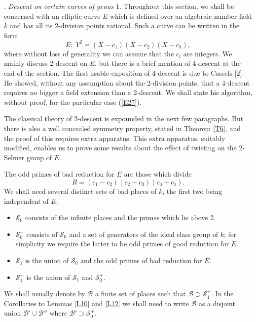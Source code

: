 \documentclass[12pt]{article}
\def\sB{{\mathcal B}}
\def\sS{{\mathcal S}}
\def\beq{\begin{equation} \label}
\begin{document}
\newpage

. \emph{Descent on certain curves of genus $1$}.
\newline
Throughout this section, we shall be concerned with an elliptic curve $E$
which is defined over an algebraic number field $k$ and has all its 2-division
points rational. Such a curve can be written in the form
\beq{E27} E:\; Y^2=(X-c_1)(X-c_2)(X-c_3), \end{equation}
where without loss of generality we can assume that the $c_i$
are integers. We mainly discuss 2-descent on $E$, but there
is a brief mention of 4-descent at the end of the section.
The first usable exposition of 4-descent is due to Cassels
[2]. He showed, without any
assumption about the 2-division points, that a 4-descent
requires no bigger a field extension than a 2-descent. We
shall state his
algorithm, without proof, for the particular case (\ref{E27}).

The classical theory of
2-descent is expounded in the next few paragraphs. But there is also a well
concealed symmetry property, stated in Theorem \ref{T6}, and the
proof of this requires extra apparatus. This extra apparatus,
suitably modified, enables us to prove some results about the
effect of twisting on the 2-Selmer group of $E$.


The odd primes of bad reduction for $E$ are those which divide
\[ R=(c_1-c_2)(c_2-c_3)(c_3-c_1). \]
We shall need several distinct sets of bad places of $k$, the first two being
independent of $E$:
\begin{itemize}
\item $\sS_0$ consists of the infinite places and the primes which lie above
2.
\item $\sS_0^+$ consists of $\sS_0$ and a set of generators of the ideal
class group of $k$; for simplicity we require the latter to be
odd primes of good reduction for $E$.
\item $\sS_1$ is the union of $\sS_0$ and the odd primes of bad reduction for
$E$.
\item $\sS_1^+$ is the union of $\sS_1$ and $\sS_0^+$.
\end{itemize}
We shall usually denote by $\sB$ a finite set of places such that
$\sB\supset\sS^+_1$. In the Corollaries to Lemmas \ref{L10}
and \ref{L12} we
shall need to write $\sB$ as a disjoint union $\sB'\cup\sB''$
where $\sB'\supset\sS^+_0$.
\end{document}
